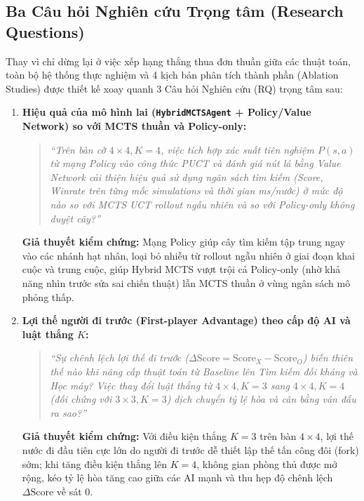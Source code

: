 \documentclass[a4paper,12pt]{report}
\begin{document}
\subsection{Ba Câu hỏi Nghiên cứu Trọng tâm (Research Questions)}
Thay vì chỉ dừng lại ở việc xếp hạng thắng thua đơn thuần giữa các thuật toán, toàn bộ hệ thống thực nghiệm và 4 kịch bản phân tích thành phần (Ablation Studies) được thiết kế xoay quanh 3 Câu hỏi Nghiên cứu (RQ) trọng tâm sau:

\begin{enumerate}[label=\textbf{RQ\arabic*:}, leftmargin=1.5cm]
    \item \textbf{Hiệu quả của mô hình lai (\texttt{HybridMCTSAgent} + Policy/Value Network) so với MCTS thuần và Policy-only:}
    \begin{quote}
        \textit{``Trên bàn cờ $4 \times 4, K=4$, việc tích hợp xác suất tiên nghiệm $P(s, a)$ từ mạng Policy vào công thức PUCT và đánh giá nút lá bằng Value Network cải thiện hiệu quả sử dụng ngân sách tìm kiếm (Score, Winrate trên từng mốc simulations và thời gian ms/nước) ở mức độ nào so với MCTS UCT rollout ngẫu nhiên và so với Policy-only không duyệt cây?''}
    \end{quote}
    \textbf{Giả thuyết kiểm chứng:} Mạng Policy giúp cây tìm kiếm tập trung ngay vào các nhánh hạt nhân, loại bỏ nhiễu từ rollout ngẫu nhiên ở giai đoạn khai cuộc và trung cuộc, giúp Hybrid MCTS vượt trội cả Policy-only (nhờ khả năng nhìn trước sửa sai chiến thuật) lẫn MCTS thuần ở vùng ngân sách mô phỏng thấp.

    \item \textbf{Lợi thế người đi trước (First-player Advantage) theo cấp độ AI và luật thắng $K$:}
    \begin{quote}
        \textit{``Sự chênh lệch lợi thế đi trước ($\Delta\text{Score} = \text{Score}_X - \text{Score}_O$) biến thiên thế nào khi nâng cấp thuật toán từ Baseline lên Tìm kiếm đối kháng và Học máy? Việc thay đổi luật thắng từ $4 \times 4, K=3$ sang $4 \times 4, K=4$ (đối chứng với $3 \times 3, K=3$) dịch chuyển tỷ lệ hòa và cân bằng ván đấu ra sao?''}
    \end{quote}
    \textbf{Giả thuyết kiểm chứng:} Với điều kiện thắng $K=3$ trên bàn $4 \times 4$, lợi thế nước đi đầu tiên cực lớn do người đi trước dễ thiết lập thế tấn công đôi (fork) sớm; khi tăng điều kiện thắng lên $K=4$, không gian phòng thủ được mở rộng, kéo tỷ lệ hòa tăng cao giữa các AI mạnh và thu hẹp độ chênh lệch $\Delta\text{Score}$ về sát $0$.


\end{enumerate}
\end{document}
